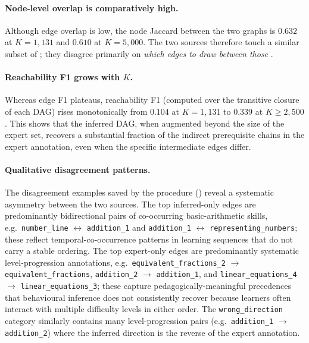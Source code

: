 \paragraph{Node-level overlap is comparatively high.}
Although edge overlap is low, the node Jaccard between the two graphs
is $0.632$ at $K=1{,}131$ and $0.610$ at $K=5{,}000$. The two sources
therefore touch a similar subset of \KCs{}; they disagree primarily on
\emph{which edges to draw between those \KCs{}}.

\paragraph{Reachability F1 grows with $K$.}
Whereas edge F1 plateaus, reachability F1 (computed over the transitive
closure of each DAG) rises monotonically from $0.104$ at $K=1{,}131$
to $0.339$ at $K \geq 2{,}500$. This shows that the inferred DAG, when
augmented beyond the size of the expert set, recovers a substantial
fraction of the indirect prerequisite chains in the expert annotation,
even when the specific intermediate edges differ.

\paragraph{Qualitative disagreement patterns.}
The disagreement examples saved by the procedure
() reveal a
systematic asymmetry between the two sources.
The top inferred-only edges are predominantly bidirectional pairs of
co-occurring basic-arithmetic skills, e.g.\ \texttt{number\_line}
$\leftrightarrow$ \texttt{addition\_1} and \texttt{addition\_1}
$\leftrightarrow$ \texttt{representing\_numbers}; these reflect
temporal-co-occurrence patterns in learning sequences that do not
carry a stable ordering.
The top expert-only edges are predominantly systematic
level-progression annotations, e.g.\ \texttt{equivalent\_fractions\_2}
$\rightarrow$ \texttt{equivalent\_fractions}, \texttt{addition\_2}
$\rightarrow$ \texttt{addition\_1}, and
\texttt{linear\_equations\_4} $\rightarrow$ \texttt{linear\_equations\_3};
these capture pedagogically-meaningful precedences that behavioural
inference does not consistently recover because learners often interact
with multiple difficulty levels in either order.
The \texttt{wrong\_direction} category similarly contains many
level-progression pairs (e.g.\ \texttt{addition\_1} $\rightarrow$
\texttt{addition\_2}) where the inferred direction is the reverse of
the expert annotation.

